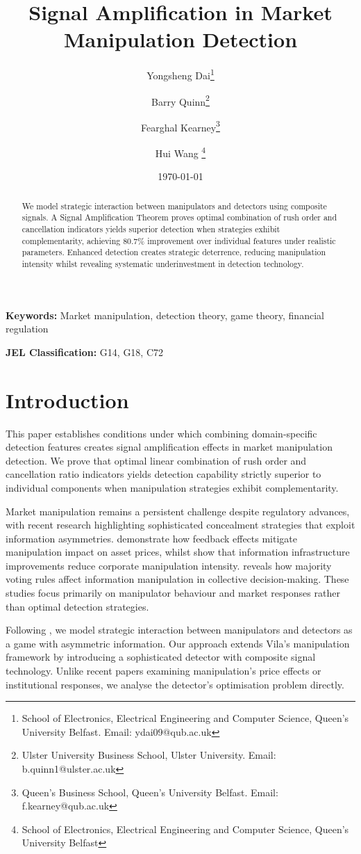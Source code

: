\documentclass[12pt]{article}
\title{Signal Amplification in Market Manipulation Detection}
\author{Yongsheng Dai\thanks{School of Electronics, Electrical Engineering and Computer Science, Queen's University Belfast. Email: ydai09@qub.ac.uk} \and 
Barry Quinn\thanks{Ulster University Business School, Ulster University. Email: b.quinn1@ulster.ac.uk} \and 
Fearghal Kearney\thanks{Queen's Business School, Queen's University Belfast. Email: f.kearney@qub.ac.uk} \and Hui Wang \thanks{School of Electronics, Electrical Engineering and Computer Science, Queen's University Belfast}
}
\date{\today}
\begin{document}
\maketitle

\begin{abstract}
We model strategic interaction between manipulators and detectors using composite signals. A Signal Amplification Theorem proves optimal combination of rush order and cancellation indicators yields superior detection when strategies exhibit complementarity, achieving 80.7\% improvement over individual features under realistic parameters. Enhanced detection creates strategic deterrence, reducing manipulation intensity whilst revealing systematic underinvestment in detection technology.
\end{abstract}

\textbf{Keywords:} Market manipulation, detection theory, game theory, financial regulation

\textbf{JEL Classification:} G14, G18, C72

\section{Introduction}

This paper establishes conditions under which combining domain-specific detection features creates signal amplification effects in market manipulation detection. We prove that optimal linear combination of rush order and cancellation ratio indicators yields detection capability strictly superior to individual components when manipulation strategies exhibit complementarity.

Market manipulation remains a persistent challenge despite regulatory advances, with recent research highlighting sophisticated concealment strategies that exploit information asymmetries. \citet{liu2024asset} demonstrate how feedback effects mitigate manipulation impact on asset prices, whilst \citet{xiong2024information} show that information infrastructure improvements reduce corporate manipulation intensity. \citet{wang2024information} reveals how majority voting rules affect information manipulation in collective decision-making. These studies focus primarily on manipulator behaviour and market responses rather than optimal detection strategies.

Following \citet{vila1989simple}, we model strategic interaction between manipulators and detectors as a game with asymmetric information. Our approach extends Vila's manipulation framework by introducing a sophisticated detector with composite signal technology. Unlike recent papers examining manipulation's price effects or institutional responses, we analyse the detector's optimisation problem directly.
\end{document}
